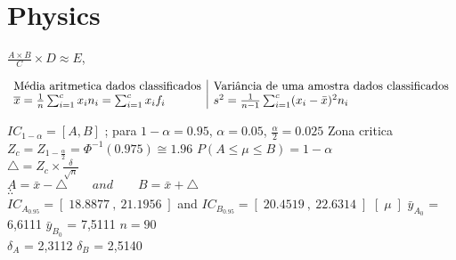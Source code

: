 \chapter{Physics}
$\frac{A \times B}{C}\times D \approx E$,
\newline
\begin{minipage}{0pt}
	$$\begin{array}{l | l}
		\text{Média aritmetica dados classificados} & \text{Variância de uma amostra dados classificados} \\
		\overline{x} = \frac{1}{n}\sum_{i=1}^cx_in_i = \sum_{i=1}^cx_if_i & s^2 = \frac{1}{n-1}\sum_{i=1}^c (x_i-\bar{x})^2 n_i
	\end{array}$$
\end{minipage}
\newline
\vspace{1cm}
\newline
$IC_{1-\alpha}=\left[ A, B\right]$ ; para $1-\alpha = 0.95$, $\alpha=0.05$, $\frac{\alpha}{2}=0.025$
\newline
\vspace{1cm}
\newline
Zona critica $Z_c=Z_{1-\frac{\alpha}{2}}=\Phi^{-1}(0.975) \cong 1.96$
\newline
\vspace{1cm}
\newline
$P\left( A \leqslant \mu \leqslant B \right) = 1-\alpha$ \\
$\triangle=Z_c\times\frac{\delta}{\sqrt{n}}$ \\
$A = \bar{x}-\triangle \qquad and \qquad B = \bar{x}+\triangle$ \\
$\therefore$\\
$IC_{A_{0.95}}=\left[ \; 18.8877 \: , \: 21.1956 \; \right]$ \hspace{1cm} and \hspace{1cm} $IC_{B_{0.95}}=\left[ \; 20.4519 \: , \: 22.6314 \; \right]$
\newline
\vspace{1cm}
\newline
$\left[ \; \mu \; \right]$
\newline
\vspace{1cm}
\newline
$\bar{y}_{A_0}$ = 6,6111 \qquad $\bar{y}_{B_0}$ = 7,5111 \qquad $n=90$ \\
$\delta_A$ = 2,3112 \qquad $\delta_B$ = 2,5140
\newline
\vspace{1cm}
